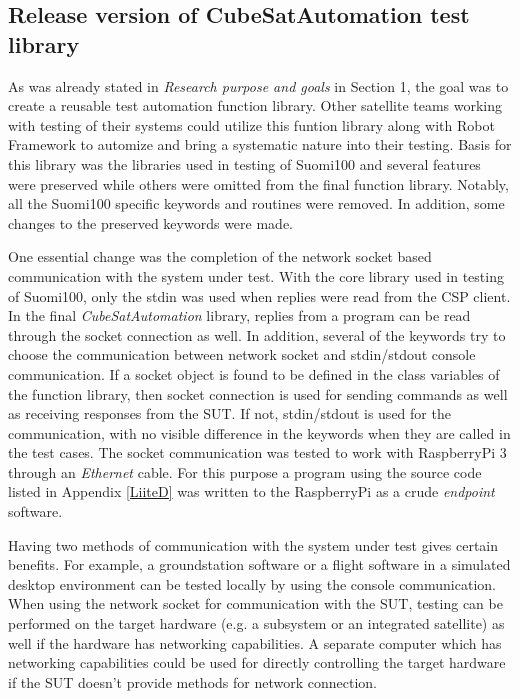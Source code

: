 \documentclass[english,12pt,a4paper,pdftex,elec,utf8]{aaltothesis}
\begin{document}
\subsection{Release version of CubeSatAutomation test library}
As was already stated in \textit{Research purpose and goals} in Section 1, the goal was to create a reusable test automation function library. Other satellite teams working with testing of their systems could utilize this funtion library along with Robot Framework to automize and bring a systematic nature into their testing. 
Basis for this library was the libraries used in testing of Suomi100 and several features were preserved while others were omitted from the final function library. Notably, all the Suomi100 specific keywords and routines were removed. In addition, some changes to the preserved keywords were made.\par 
One essential change was the completion of the network socket based communication with the system under test. With the core library used in testing of Suomi100, only the stdin was used when replies were read from the CSP client. In the final \textit{CubeSatAutomation} library, replies from a program can be read through the socket connection as well. In addition, several of the keywords try to choose the communication between network socket and stdin/stdout console communication. If a socket object is found to be defined in the class variables of the function library, then socket connection is used for sending commands as well as receiving responses from the SUT. If not, stdin/stdout is used for the communication, with no visible difference in the keywords when they are called in the test cases. The socket communication was tested to work with RaspberryPi 3 through an \textit{Ethernet} cable. For this purpose a program using the source code listed in Appendix \ref{LiiteD} was written to the RaspberryPi as a crude \textit{endpoint} software.  \par
Having two methods of communication with the system under test gives certain benefits. For example, a groundstation software or a flight software in a simulated desktop environment can be tested locally by using the console communication. When using the network socket for communication with the SUT, testing can be performed on the target hardware (e.g. a subsystem or an integrated satellite) as well if the hardware has networking capabilities. A separate computer which has networking capabilities could be used for directly controlling the target hardware if the SUT doesn't provide methods for network connection. \par 
\end{document}
